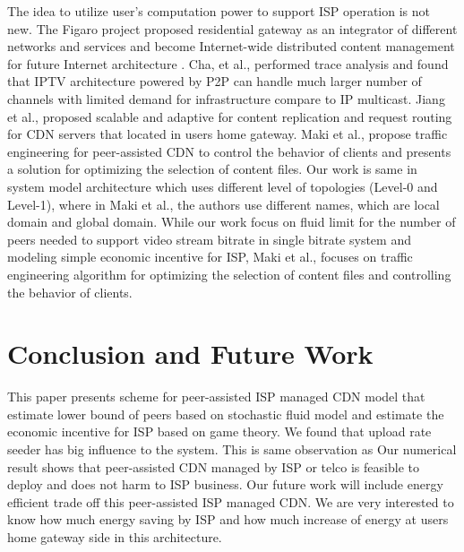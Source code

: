 \documentclass[paper]{ieice}
\begin{document}
The idea to utilize user's computation power to support ISP operation is not new.  
The Figaro project \cite{figaro} proposed residential gateway as an integrator of different networks and services and become Internet-wide distributed content management for future Internet architecture \cite{figaro}. 
Cha, et al.,\cite{Cha:2008:NTP:1855641.1855646} performed trace analysis and found that IPTV architecture powered by P2P can handle much larger number of channels with limited demand for infrastructure compare to IP multicast. 
Jiang et al., \cite{Jiang:2012:OMD:2413176.2413193} proposed scalable and adaptive for content replication and request routing for CDN servers that located in users home gateway. 
Maki et al.,\cite{NaoyaMAKI2012} propose traffic engineering for peer-assisted CDN to control the behavior of clients and presents a solution for optimizing the selection of content files.
Our work is same in system model architecture which uses different level of topologies  (Level-0 and Level-1), where in Maki et al., \cite{NaoyaMAKI2012} the authors use different names, which are local domain and global domain. 
While our work focus on fluid limit for the number of peers needed to support video stream bitrate in single bitrate system and modeling simple economic incentive for ISP, Maki et al., \cite{NaoyaMAKI2012} focuses on traffic engineering algorithm for optimizing the selection of content files and controlling the behavior of clients.

\section{Conclusion and Future Work}\label{conclude}
This paper presents scheme for peer-assisted ISP managed CDN model that estimate lower bound of peers based on stochastic fluid model and estimate the economic incentive for ISP based on game theory.  
We found that upload rate seeder has big influence to the system.  
This is same observation as \cite{DBLP:journals/corr/abs-1212-4915}
Our numerical result shows that peer-assisted CDN managed by ISP or telco is feasible to deploy and does not harm to ISP business. 
Our future work will include energy efficient trade off this peer-assisted ISP managed CDN. 
We are very interested to know how much energy saving by ISP and how much increase of energy at users home gateway side in this architecture. 



\end{document}
